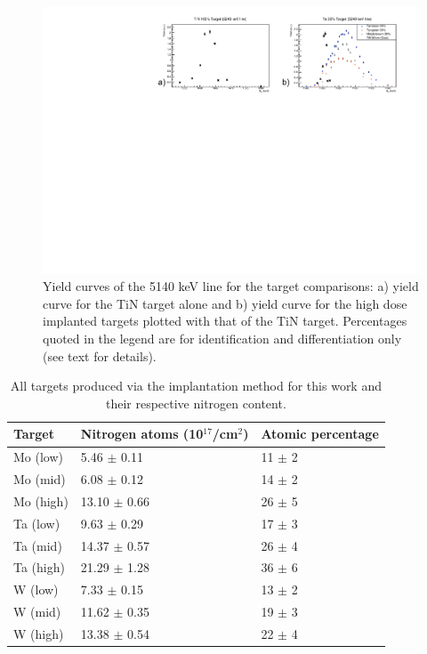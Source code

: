 \begin{figure}
\includegraphics[width=\linewidth]{figures/tiNcompare.pdf}
\caption{Yield curves of the 5140 keV line for the target comparisons: a) yield curve for the TiN target alone and b) yield curve for the high dose implanted targets plotted with that of the TiN target. Percentages quoted in the legend are for identification and differentiation only (see text for details).}
\label{fig: yieldComparison}
\end{figure}


\begin{table}[]
\centering
\begin{tabular}{@{}lll@{}}
\toprule
Target    & Nitrogen atoms (10$^{17}$/cm$^{2}$) & Atomic percentage \\ \midrule
Mo (low)  & 5.46 $\pm$ 0.11                     & 11 $\pm$ 2        \\
Mo (mid)  & 6.08 $\pm$ 0.12                     & 14 $\pm$ 2        \\
Mo (high) & 13.10 $\pm$ 0.66                    & 26 $\pm$ 5        \\
Ta (low)  & 9.63 $\pm$ 0.29                     & 17 $\pm$ 3        \\
Ta (mid)  & 14.37 $\pm$ 0.57                    & 26 $\pm$ 4        \\
Ta (high) & 21.29 $\pm$ 1.28                    & 36 $\pm$ 6        \\
W (low)   & 7.33 $\pm$ 0.15                     & 13 $\pm$ 2        \\
W (mid)   & 11.62 $\pm$ 0.35                    & 19 $\pm$ 3        \\
W (high)  & 13.38 $\pm$ 0.54                    & 22 $\pm$ 4        \\ \bottomrule
\end{tabular}
\caption{All targets produced via the implantation method for this work and their respective nitrogen content. }
\label{table: implantedTargets}
\end{table}



